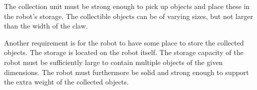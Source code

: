 The collection unit must be strong enough to pick up objects and place these in the robot's storage. The collectible objects can be of varying sizes, but not larger than the width of the claw.

Another requirement is for the robot to have some place to store the collected objects. The storage is located on the robot itself. The storage capacity of the robot must be sufficiently large to contain multiple objects of the given dimensions. The robot must furthermore be solid and strong enough to support the extra weight of the collected objects. 





